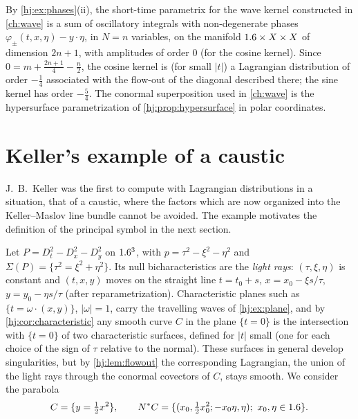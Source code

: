 \begin{remark}\label{hj:rem:wave-kernel}
  By \cref{hj:ex:phases}(ii), the short-time parametrix for the wave kernel
  constructed in \cref{ch:wave} is a sum of oscillatory integrals with
  non-degenerate phases $\varphi_\pm(t,x,\eta)-y\cdot\eta$, in $N=n$ variables, on
  the manifold $1.6\times X\times X$ of dimension $2n+1$, with amplitudes of order
  $0$ (for the cosine kernel).  Since $0=m+\frac{2n+1}4-\frac n2$, the cosine
  kernel is (for small $|t|$) a Lagrangian distribution of order $-\frac14$
  associated with the flow-out of the diagonal described there; the sine kernel
  has order $-\frac54$.  The conormal superposition used in \cref{ch:wave} is the
  hypersurface parametrization of \cref{hj:prop:hypersurface} in polar
  coordinates.
\end{remark}

\section{Keller's example of a caustic}\label{hj:sec:keller}

J.~B.~Keller was the first to compute with Lagrangian distributions in a
situation, that of a caustic, where the factors which are now organized into the
Keller--Maslov line bundle cannot be avoided.  The example motivates the
definition of the principal symbol in the next section.

Let $P=D_t^2-D_x^2-D_y^2$ on $1.6^3$, with $p=\tau^2-\xi^2-\eta^2$ and
$\Sigma(P)=\{\tau^2=\xi^2+\eta^2\}$.  Its null bicharacteristics are the
\emph{light rays}: $(\tau,\xi,\eta)$ is constant and $(t,x,y)$ moves on the
straight line $t=t_0+s$, $x=x_0-\xi s/\tau$, $y=y_0-\eta s/\tau$ (after
reparametrization).  Characteristic planes such as $\{t=\omega\cdot(x,y)\}$,
$|\omega|=1$, carry the travelling waves of \cref{hj:ex:plane}, and by
\cref{hj:cor:characteristic} any smooth curve $C$ in the plane $\{t=0\}$ is the
intersection with $\{t=0\}$ of two characteristic surfaces, defined for $|t|$
small (one for each choice of the sign of $\tau$ relative to the normal).  These
surfaces in general develop singularities, but by \cref{hj:lem:flowout} the
corresponding Lagrangian, the union of the light rays through the conormal
covectors of $C$, stays smooth.  We consider the parabola
\begin{equation*}
  C=\{y=\tfrac12x^2\},\qquad N^*C=\{(x_0,\tfrac12x_0^2;-x_0\eta,\eta);\
  x_0,\eta\in1.6\}.
\end{equation*}

